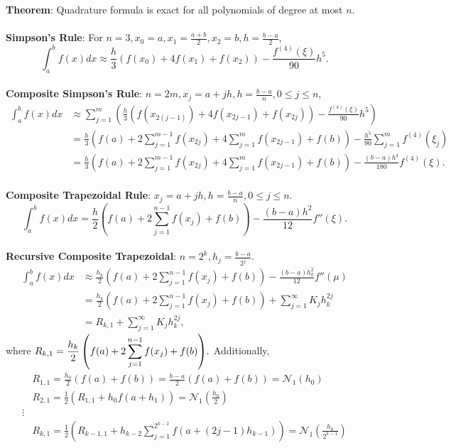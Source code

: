 \documentclass{article}
\begin{document}
\textbf{Theorem}: Quadrature formula is exact for all polynomials of degree at most $n$. \\ \\
\textbf{Simpson's Rule}: For $n = 3, x_0 = a, x_1 = \frac{a + b}{2}, x_2 = b, h = \frac{b - a}{2}$, $$\int_a^b f(x)dx \approx \frac{h}{3} (f(x_0) + 4f(x_1) + f(x_2)) - \frac{f^{(4)} (\xi)}{90}h^5.$$ \\
\textbf{Composite Simpson's Rule}: $n = 2m, x_j = a + jh, h = \frac{b - a}{n}, 0 \leq j \leq n$, \begin{align*}
    \int_a^b f(x)dx &\approx \sum_{j = 1}^m \left( \frac{h}{3} (f(x_{2(j - 1)}) + 4f(x_{2j - 1}) + f(x_{2j})) - \frac{f^{(4)} (\xi)}{90}h^5 \right) \\
    &= \frac{h}{3} (f(a) + 2\sum_{j = 1}^{m - 1} f(x_{2j}) + 4\sum_{j = 1}^m f(x_{2j - 1}) + f(b)) - \frac{h^5}{90} \sum_{j = 1}^m f^{(4)} (\xi_j) \\
    &= \frac{h}{3} (f(a) + 2\sum_{j = 1}^{m - 1} f(x_{2j}) + 4\sum_{j = 1}^m f(x_{2j - 1}) + f(b)) - \frac{(b - a)h^4}{180} f^{(4)} (\xi).
\end{align*} \\
\textbf{Composite Trapezoidal Rule}: $x_j = a + jh, h = \frac{b - a}{n}, 0 \leq j \leq n$. $$\int_a^b f(x)dx = \frac{h}{2} \left( f(a) + 2\sum_{j = 1}^{n - 1} f(x_j) + f(b) \right) - \frac{(b - a)h^2}{12} f''(\xi).$$ \\
\textbf{Recursive Composite Trapezoidal}: $n = 2^k, h_j = \frac{b - a}{2^j}$. \begin{align*}
    \int_a^b f(x)dx &\approx \frac{h_k}{2} \left( f(a) + 2\sum_{j = 1}^{n - 1} f(x_j) + f(b) \right) - \frac{(b - a) h_k^2}{12}f''(\mu) \\
    &= \frac{h_k}{2} \left( f(a) + 2\sum_{j = 1}^{n - 1} f(x_j) + f(b) \right) + \sum_{j = 1}^\infty K_j h_k^{2j} \\
    &= R_{k, 1} + \sum_{j = 1}^\infty K_j h_k^{2j},
\end{align*} where $\mathlarger{R_{k, 1} = \frac{h_k}{2} \left( f(a) + 2\sum_{j = 1}^{n - 1} f(x_j) + f(b) \right)}.$ Additionally, \begin{align*}
    &R_{1, 1} = \frac{h_0}{2} (f(a) + f(b)) = \frac{b - a}{2}(f(a) + f(b)) = \mathcal{N}_1(h_0) \\
    &R_{2, 1} = \frac{1}{2} (R_{1, 1} + h_0f(a + h_1)) = \mathcal{N}_1 \left( \frac{h_0}{2} \right) \\
    \vdots \\
    &R_{k, 1} = \frac{1}{2} \left( R_{k - 1, 1} + h_{k - 2} \sum_{j = 1}^{2^{k - 2}} f(a + (2j - 1)h_{k - 1}) \right) = \mathcal{N}_1\left( \frac{h_0}{2^{k - 1}}\right)
\end{align*} \\
\end{document}
